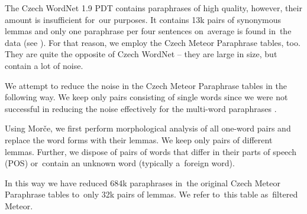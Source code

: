The Czech WordNet 1.9 PDT contains paraphrases of high quality, however, their amount is 
insufficient for~our purposes. It contains 13k pairs of synonymous lemmas and only one 
paraphrase per four sentences on~average is found in~the data (see ).  
For that reason, we employ the Czech Meteor Paraphrase tables, too. They are quite the 
opposite of Czech WordNet -- they are large in size, but contain a lot of noise.

We attempt to reduce the noise in the Czech Meteor Paraphrase tables in the following way. We 
keep only pairs consisting of single words since we were not successful in reducing the noise
effectively for the multi-word paraphrases \cite{barancikova-etal-2014-improving}. 

Using Morče, we first perform morphological analysis of all one-word pairs and replace 
the word forms with their lemmas.  We keep only pairs of different lemmas. Further, we
 dispose of pairs of words that differ in their parts of speech (POS) or~contain an 
unknown word (typically a~foreign word). 

In this way we have reduced 684k paraphrases in~the original Czech Meteor Paraphrase tables 
to~only 32k pairs of lemmas. We refer to~this table as~filtered Meteor.

